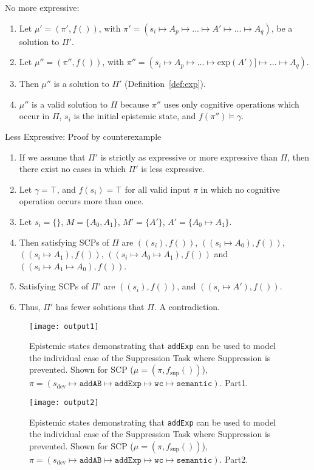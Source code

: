\begin{bulletProof} \label{proof:aggregateExpressiveness}
\item No more expressive:
\begin{enumerate}
\item Let $\mu'=(\pi',f())$, with $\pi' = (s_i\longmapsto A_p \longmapsto ... \longmapsto A' \longmapsto ... \longmapsto A_q)$, be a solution to $\Pi'$.
\item Let $\mu''=(\pi'',f())$, with $\pi'' = (s_i\longmapsto A_p \longmapsto ... \longmapsto \text{exp}(A')] \longmapsto ... \longmapsto A_q)$.
\item Then $\mu''$ is a solution to $\Pi'$ (Definition~\ref{def:exp}).
\item $\mu''$ is a valid solution to $\Pi$ because $\pi''$ uses only cognitive operations which occur in $\Pi$, $s_i$ is the initial epistemic state, and $f(\pi'') \models \gamma$. 
\end{enumerate}
\item Less Expressive: Proof by counterexample
\begin{enumerate}
\item If we assume that $\Pi'$ is strictly as expressive or more expressive than $\Pi$, then there exist no cases in which $\Pi'$ is less expressive.
\item Let $\gamma = \top$, and $f(s_i)=\top$ for all valid input $\pi$ in which no cognitive operation occurs more than once.
\item Let $s_i=\{\}$, $M=\{A_0,A_1\}$, $M'=\{A'\}$, $A'=\{A_0\longmapsto A_1\}$.
\item Then satisfying SCPs of $\Pi$ are $((s_i),f())$, $((s_i \longmapsto A_0),f())$, $((s_i \longmapsto A_1),f())$, $((s_i \longmapsto A_0\longmapsto A_1),f())$ and $((s_i \longmapsto A_1\longmapsto A_0),f())$.
\item Satisfying SCPs of $\Pi'$ are $((s_i),f())$, and $((s_i \longmapsto A'),f())$.
\item Thus, $\Pi'$ has fewer solutions that $\Pi$. A contradiction.
\end{enumerate}
\end{bulletProof}


\begin{figure}
\centering \texttt{[image: output1]}
\caption{Epistemic states demonstrating that \texttt{addExp} can be used to model the individual case of the Suppression Task where Suppression is prevented. Shown for SCP ($\mu=(\pi,f_\text{sup}())$), $\pi = (s_\text{dev} \longmapsto \texttt{addAB} \longmapsto \texttt{addExp} \longmapsto \texttt{wc} \longmapsto \texttt{semantic} )$. Part1.}
\label{fig:suppression_python}
\end{figure}
\begin{figure}
\centering \texttt{[image: output2]}
\caption{Epistemic states demonstrating that \texttt{addExp} can be used to model the individual case of the Suppression Task where Suppression is prevented. Shown for SCP ($\mu=(\pi,f_\text{sup}())$), $\pi = (s_\text{dev} \longmapsto \texttt{addAB} \longmapsto \texttt{addExp} \longmapsto \texttt{wc} \longmapsto \texttt{semantic} )$. Part2.}
\label{fig:suppression_python2}
\end{figure}

